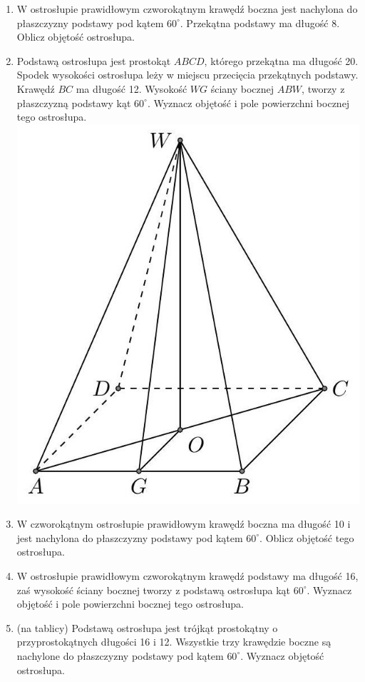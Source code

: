 \documentclass[10pt]{article}
\begin{document}
\begin{enumerate}
  \item W ostrosłupie prawidłowym czworokątnym krawędź boczna jest nachylona do płaszczyzny podstawy pod kątem \(60^{\circ}\). Przekątna podstawy ma długość 8. Oblicz objętość ostrosłupa.
  \item Podstawą ostrosłupa jest prostokąt \(A B C D\), którego przekątna ma długość 20. Spodek wysokości ostrosłupa leży w miejscu przecięcia przekątnych podstawy. Krawędź \(B C\) ma długość 12. Wysokość \(W G\) ściany bocznej \(A B W\), tworzy z płaszczyzną podstawy kąt \(60^{\circ}\). Wyznacz objętość i pole powierzchni bocznej tego ostrosłupa.\\
\includegraphics[max width=\textwidth, center]{2024_11_21_e9b4faa005d5be2cc318g-092(1)}
  \item W czworokątnym ostrosłupie prawidłowym krawędź boczna ma długość 10 i jest nachylona do płaszczyzny podstawy pod kątem \(60^{\circ}\). Oblicz objętość tego ostrosłupa.
  \item W ostrosłupie prawidłowym czworokątnym krawędź podstawy ma długość 16, zaś wysokość ściany bocznej tworzy z podstawą ostrosłupa kąt \(60^{\circ}\). Wyznacz objętość i pole powierzchni bocznej tego ostrosłupa.
  \item (na tablicy) Podstawą ostrosłupa jest trójkąt prostokątny o przyprostokątnych długości 16 i 12. Wszystkie trzy krawędzie boczne są nachylone do płaszczyzny podstawy pod kątem \(60^{\circ}\). Wyznacz objętość ostrosłupa.\\

\end{enumerate}
\end{document}

